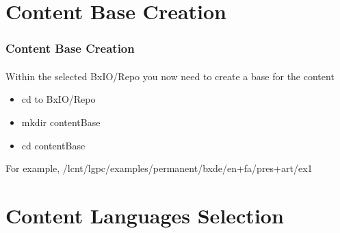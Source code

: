 \section{Content Base Creation}

\begin{comment}
*****  [[elisp:(org-cycle)][| ]]  [[elisp:(blee:ppmm:org-mode-toggle)][Nat]] [[elisp:(beginning-of-buffer)][Top]] [[elisp:(delete-other-windows)][(1)]] || /Frame/ *Label=ContentBaseCreation*  Content Base Creation ::  [[elisp:(org-cycle)][| ]]
\end{comment}

\begin{frame}[fragile,label=ContentBaseCreation]
    \frametitle{Content Base Creation}
    \framesubtitle{}

Within the selected BxIO/Repo you now need to create a base for the content
    
\begin{itemize}
\item cd to BxIO/Repo
\item mkdir contentBase
\item cd contentBase
\end{itemize}

For example,  /lcnt/lgpc/examples/permanent/bxde/en+fa/pres+art/ex1

\end{frame}



\begin{comment}
*  [[elisp:(org-cycle)][| ]] [[elisp:(org-show-subtree)][|=]] [[elisp:(show-children 10)][|V]] [[elisp:(bx:orgm:indirectBufOther)][|>]] [[elisp:(bx:orgm:indirectBufMain)][|I]] [[elisp:(blee:ppmm:org-mode-toggle)][|N]] [[elisp:(org-top-overview)][|O]] [[elisp:(progn (org-shifttab) (org-content))][|C]] [[elisp:(delete-other-windows)][|1]]  /Section/   Content Languages Selection ::  [[elisp:(org-cycle)][| ]]
\end{comment}

\section{Content Languages Selection}

